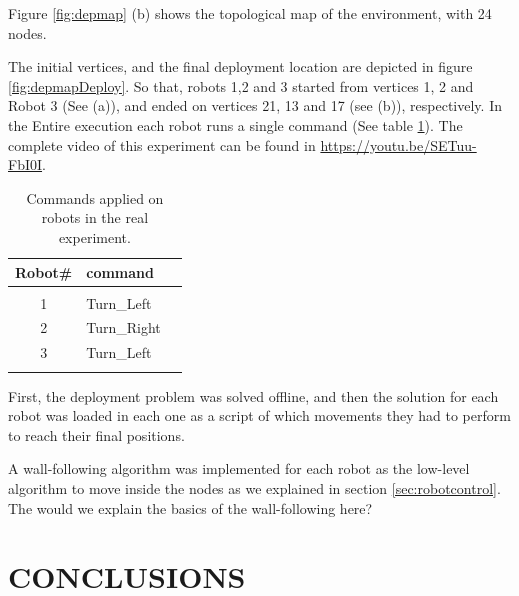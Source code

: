 \documentclass[twocolumn]{svjour3}       %
\begin{document}
Figure \ref{fig:depmap} (b) shows the topological map of the environment, with 24 nodes. 

The initial vertices, and the final deployment location are depicted in figure \ref{fig:depmapDeploy}. So that, robots 1,2 and 3 started from vertices 1, 2 and Robot 3 (See (a)), and ended on vertices 21, 13 and 17 (see (b)), respectively. In the Entire execution each robot runs a single command (See table \ref{tbl:commands}). The complete video of this experiment can be found in \href{https://youtu.be/SETuu-FbI0I}{https://youtu.be/SETuu-FbI0I}.

\begin{table}[t]
\centering
\caption{Commands applied on robots in the real experiment. }
\label{tbl:commands}
\begin{tabular}{cm{2cm}m{1.2cm}}
Robot\#    & command    \\
\hline\\
1   & Turn\_Left   \\
2 &  Turn\_Right \\
3 & Turn\_Left \\
\hline\\
\end{tabular}
\end{table}

{\color{red}
First, the deployment problem was solved offline, and then the solution for each robot was loaded in each one as a script of which movements they had to perform to reach their final positions. 
}

A wall-following algorithm was implemented for each robot as the low-level algorithm to move inside the nodes as we explained in section \ref{sec:robotcontrol}. The 
{\color{green}would we explain the basics of the wall-following here?}

\section{CONCLUSIONS}
\label{sec:conclusion}
\end{document}
